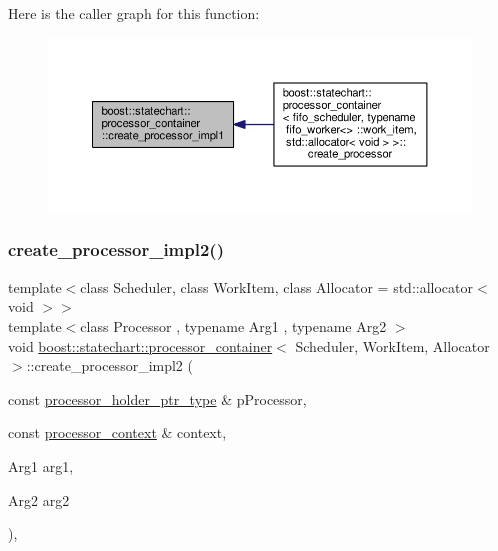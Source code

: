 Here is the caller graph for this function\+:
\nopagebreak
\begin{figure}[H]
\begin{center}
\leavevmode
\includegraphics[width=350pt]{classboost_1_1statechart_1_1processor__container_aa71e924b6ff8927f6227a79fa1b9eaff_icgraph}
\end{center}
\end{figure}
\mbox{\label{classboost_1_1statechart_1_1processor__container_a4374dc658b395822eec1043189b90ab1}} 
\subsubsection{\texorpdfstring{create\+\_\+processor\+\_\+impl2()}{create\_processor\_impl2()}}
{\footnotesize\ttfamily template$<$class Scheduler, class Work\+Item, class Allocator = std\+::allocator$<$ void $>$$>$ \\
template$<$class Processor , typename Arg1 , typename Arg2 $>$ \\
void \mbox{\hyperlink{classboost_1_1statechart_1_1processor__container}{boost\+::statechart\+::processor\+\_\+container}}$<$ Scheduler, Work\+Item, Allocator $>$\+::create\+\_\+processor\+\_\+impl2 (\begin{DoxyParamCaption}\item[{const \mbox{\hyperlink{classboost_1_1statechart_1_1processor__container_a885e5a42694857bfaa44ec053ed20a57}{processor\+\_\+holder\+\_\+ptr\+\_\+type}} \&}]{p\+Processor,  }\item[{const \mbox{\hyperlink{classboost_1_1statechart_1_1processor__container_1_1processor__context}{processor\+\_\+context}} \&}]{context,  }\item[{Arg1}]{arg1,  }\item[{Arg2}]{arg2 }\end{DoxyParamCaption})\hspace{0.3cm}{\ttfamily [inline]}, {\ttfamily [private]}}

